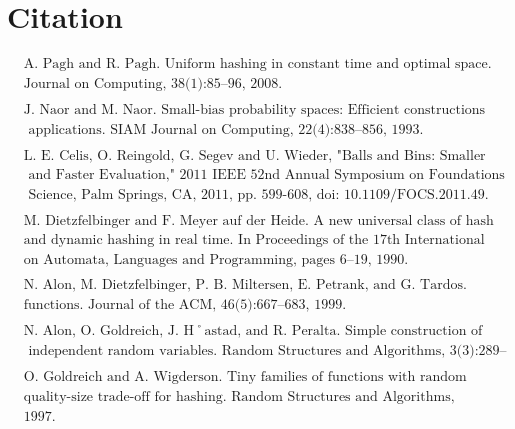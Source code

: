 \documentclass[letterpaper]{article} %
\begin{document}
	\section{Citation}
\begin{align*}
	&\text{A. Pagh and R. Pagh. Uniform hashing in constant time and optimal space. SIAM}\\
	&\text{Journal on Computing, 38(1):85–96, 2008.}\\
&\\
	&\text{J. Naor and M. Naor. Small-bias probability spaces: Efficient constructions and}\\
	&\text{ applications. SIAM Journal on Computing, 22(4):838–856, 1993.}\\
&\\
	&\text{L. E. Celis, O. Reingold, G. Segev and U. Wieder, "Balls and Bins: Smaller Hash Families}\\
	&\text{ and Faster Evaluation," 2011 IEEE 52nd Annual Symposium on Foundations of Computer }\\
	&\text{ Science, Palm Springs, CA, 2011, pp. 599-608, doi: 10.1109/FOCS.2011.49.}\\
&\\
	&\text{M. Dietzfelbinger and F. Meyer auf der Heide. A new universal class of hash functions}\\
	&\text{and dynamic hashing in real time. In Proceedings of the 17th International Colloquium}\\
	&\text{on Automata, Languages and Programming, pages 6–19, 1990.}\\
&\\
	&\text{N. Alon, M. Dietzfelbinger, P. B. Miltersen, E. Petrank, and G. Tardos. Linear hash}\\
	&\text{functions. Journal of the ACM, 46(5):667–683, 1999.}\\
&\\
	&\text{N. Alon, O. Goldreich, J. H˚astad, and R. Peralta. Simple construction of almost kwise}\\
	&\text{ independent random variables. Random Structures and Algorithms, 3(3):289–304, 1992.}\\
&\\
	&\text{O. Goldreich and A. Wigderson. Tiny families of functions with random properties: A}\\
	&\text{quality-size trade-off for hashing. Random Structures and Algorithms, 11(4):315–343,}\\
	&\text{1997.}\\
\end{align*}
\end{document}
